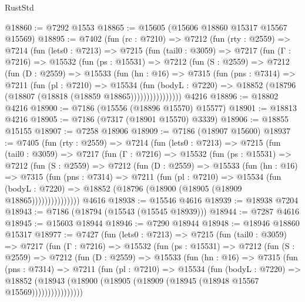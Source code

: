 \begin{lexlean}{RustStd}
\begin{coremodule}
@18860 := @7292 @1553
@18865 := @15605 (@15606 @18860 @15317 @15567 @15569)
@18895 := @7402
    (fun (rc : @7210) =>
    @7212
      (fun (rty : @2559) =>
      @7214
        (fun (lets0 : @7213) =>
        @7215
          (fun (tail0 : @3059) =>
          @7217
            (fun (Γ : @7216) =>
            @15532
              (fun (ps : @15531) =>
              @7212
                (fun (S : @2559) =>
                @7212
                  (fun (D : @2559) =>
                  @15533
                    (fun (hn : @16) =>
                    @7315
                      (fun (pns : @7314) =>
                      @7211
                        (fun (pl : @7210) =>
                        @15534
                          (fun (bodyL : @7220) =>
                          @18852 (@18796 (@18807 (@18818 (@18859 @18865))))))))))))))))
    @4216
@18896 := @18802 @4216
@18900 := @7186 (@15556 (@18896 @15570) @15577)
@18901 := @18813 @4216
@18905 := @7186 (@7317 (@18901 @15570) @3339)
@18906 := @18855 @15155
@18907 := @7258 @18906
@18909 := @7186 (@18907 @15600)
@18937 := @7405
    (fun (rty : @2559) =>
    @7214
      (fun (lets0 : @7213) =>
      @7215
        (fun (tail0 : @3059) =>
        @7217
          (fun (Γ : @7216) =>
          @15532
            (fun (ps : @15531) =>
            @7212
              (fun (S : @2559) =>
              @7212
                (fun (D : @2559) =>
                @15533
                  (fun (hn : @16) =>
                  @7315
                    (fun (pns : @7314) =>
                    @7211
                      (fun (pl : @7210) =>
                      @15534
                        (fun (bodyL : @7220) =>
                        @18852 (@18796 (@18900 (@18905 (@18909 @18865)))))))))))))))
    @4616
@18938 := @15546 @4616
@18939 := @18938 @7204
@18943 := @7186 (@18794 (@15543 (@15545 @18939)))
@18944 := @7287 @4616
@18945 := @15603 @18944
@18946 := @7290 @18944
@18948 := @18946 @18860 @15317
@18977 := @7427
    (fun (lets0 : @7213) =>
    @7215
      (fun (tail0 : @3059) =>
      @7217
        (fun (Γ : @7216) =>
        @15532
          (fun (ps : @15531) =>
          @7212
            (fun (S : @2559) =>
            @7212
              (fun (D : @2559) =>
              @15533
                (fun (hn : @16) =>
                @7315
                  (fun (pns : @7314) =>
                  @7211
                    (fun (pl : @7210) =>
                    @15534
                      (fun (bodyL : @7220) =>
                      @18852
                        (@18943
                          (@18900 (@18905 (@18909 (@18945 (@18948 @15567 @15569))))))))))))))))

\end{coremodule}
\end{lexlean}
